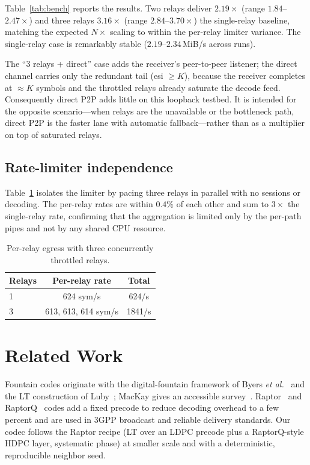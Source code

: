 \documentclass[conference]{IEEEtran}
\begin{document}
Table~\ref{tab:bench} reports the results. Two relays deliver $2.19\times$
(range $1.84$--$2.47\times$) and three relays $3.16\times$ (range
$2.84$--$3.70\times$) the single-relay baseline, matching the expected $N\times$
scaling to within the per-relay limiter variance. The single-relay case is
remarkably stable ($2.19$--$2.34$\,MiB/s across runs).

The ``3 relays + direct'' case adds the receiver's peer-to-peer listener; the
direct channel carries only the redundant tail (esi $\ge K$), because the
receiver completes at $\approx K$ symbols and the throttled relays already
saturate the decode feed. Consequently direct P2P adds little on this loopback
testbed. It is intended for the opposite scenario---when relays are the
unavailable or the bottleneck path, direct P2P is the faster lane with
automatic fallback---rather than as a multiplier on top of saturated relays.

\subsection{Rate-limiter independence}
Table~\ref{tab:throttle} isolates the limiter by pacing three relays in
parallel with no sessions or decoding. The per-relay rates are within $0.4\%$
of each other and sum to $3\times$ the single-relay rate, confirming that the
aggregation is limited only by the per-path pipes and not by any shared CPU
resource.

\begin{table}[!t]
\centering
\caption{Per-relay egress with three concurrently throttled relays.}
\label{tab:throttle}
\begin{tabular}{@{}lcc@{}}
\toprule
Relays & Per-relay rate & Total \\
\midrule
1 & 624 sym/s & 624/s \\
3 & 613, 613, 614 sym/s & 1841/s \\
\bottomrule
\end{tabular}
\end{table}

\section{Related Work}
Fountain codes originate with the digital-fountain framework of
Byers \emph{et al.}~\cite{byers1998digital} and the LT construction of
Luby~\cite{luby2002lt}; MacKay gives an accessible survey~\cite{mackay2005fountain}.
Raptor~\cite{shokrollahi2006raptor,rfc5053} and RaptorQ~\cite{rfc6330} codes add
a fixed precode to reduce decoding overhead to a few percent and are used in
3GPP broadcast and reliable delivery standards. Our codec follows the Raptor
recipe (LT over an LDPC precode plus a RaptorQ-style HDPC layer, systematic
phase) at smaller scale and with a
deterministic, reproducible neighbor seed.
\end{document}
